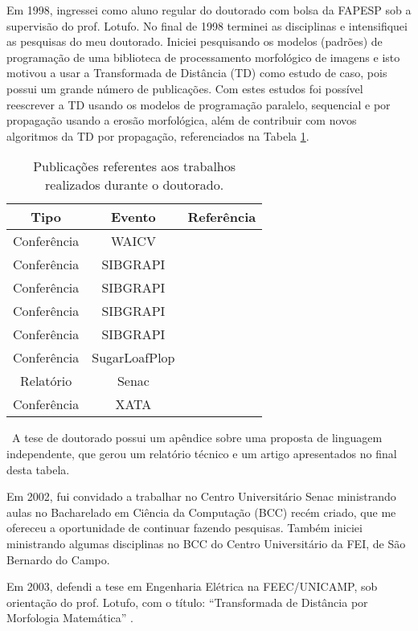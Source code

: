 Em 1998, ingressei como aluno regular do doutorado com bolsa da FAPESP sob a supervisão do prof. Lotufo. No final de 1998 terminei as disciplinas e intensifiquei as pesquisas do meu doutorado. Iniciei pesquisando os modelos (padrões) de programação de uma biblioteca de processamento morfológico de imagens e isto motivou a usar a Transformada de Distância (TD) como estudo de caso, pois possui um grande número de publicações. Com estes estudos foi possível reescrever a TD usando os modelos de programação paralelo, sequencial e por propagação usando a erosão morfológica, além de contribuir com novos algoritmos da TD por propagação, referenciados na Tabela \ref{tab:tabelaD}.
\
\begin{table}[!ht]
   \centering
   \caption{Publicações referentes aos trabalhos realizados durante o doutorado.}\label{tab:tabelaD}
\begin{tabular}{|c|c|c|}
\hline
\textbf{Tipo} & \textbf{Evento} & \textbf{Referência} \\ \hline
  Conferência & WAICV &  \cite{2000:Lotufo.Zampirolli} \\ \hline
  Conferência & SIBGRAPI &  \cite{2000:Zampirolli.Lotufo} \\ \hline
  Conferência & SIBGRAPI &  \cite{2000:Zampirolli.Lotufo.ea} \\ \hline
  Conferência & SIBGRAPI &  \cite{2001:Lotufo.Zampirolli} \\ \hline
  Conferência & SIBGRAPI &  \cite{2002:Lotufo.Falcao.ea} \\ \hline
  Conferência & SugarLoafPlop &  \cite{zampirolli2005algoritmos} \\ \hline
  Relatório & Senac &  \cite{zampirolli2003independent} \\ \hline
  Conferência & XATA &  \cite{2006:Zampirolli.Lotufo.ea} \\ \hline
\end{tabular}
\end{table}
\
A tese de doutorado possui um apêndice sobre uma proposta de linguagem independente, que gerou um relatório técnico e um artigo apresentados no final desta tabela.

Em 2002, fui convidado a trabalhar no Centro Universitário Senac ministrando aulas no Bacharelado em Ciência da Computação (BCC) recém criado, que me ofereceu a oportunidade de continuar fazendo pesquisas. Também iniciei ministrando algumas disciplinas no BCC do Centro Universitário da FEI, de São Bernardo do Campo.

Em 2003, defendi a tese em Engenharia Elétrica na FEEC/UNICAMP, sob orientação do prof. Lotufo, com o título: ``Transformada de Distância por Morfologia Matemática'' \cite{zampirolli2003transformada}.

